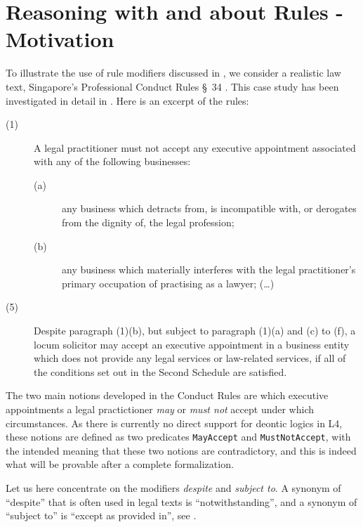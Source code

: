 \section{Reasoning with and about Rules - Motivation}\label{sec:resasoning_with_rules_app}

To illustrate the use of rule modifiers discussed in
, we consider a realistic law text,
Singapore's Professional Conduct Rules \S~34
\cite{professional_conduct_rules}. This case study has been investigated in
detail in \cite{morris21:_const_answer_set_progr_tool}. Here is an excerpt of
the rules:

\begin{description}
\item[(1)] A legal practitioner must not accept any executive appointment
  associated with any of the following businesses: 
  \begin{description}
  \item[(a)] any business which detracts from, is incompatible with, or
    derogates from the dignity of, the legal profession;
  \item[(b)] any business which materially interferes with the legal
    practitioner’s primary occupation of practising as a lawyer; (\dots)
  \end{description}
\item[(5)] Despite paragraph (1)(b), but subject to paragraph (1)(a) and (c)
  to (f), a locum solicitor may accept an executive appointment in a business
  entity which does not provide any legal services or law-related services, if
  all of the conditions set out in the Second Schedule are satisfied.
\end{description}

The two main notions developed in the Conduct Rules are which executive appointments a legal
practictioner \emph{may} or \emph{must not} accept under which
circumstances. As there is currently no direct support for deontic logics in
L4, these notions are defined as two predicates \texttt{MayAccept} and
\texttt{MustNotAccept}, with the intended meaning that these two notions are
contradictory, and this is indeed what will be provable after a complete
formalization.

Let us here concentrate on the modifiers \emph{despite} and \emph{subject
  to}. A synonym of ``despite'' that is often used in legal texts is
``notwithstanding'',  and a synonym of
``subject to'' is ``except as provided in'', see \cite{adams_contract_drafting_2004}.

